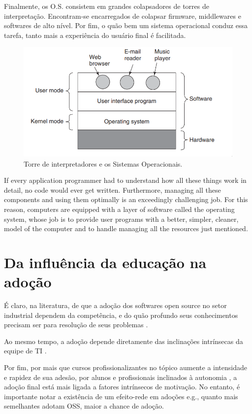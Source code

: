 \documentclass[
12pt,				%
openright,			%
oneside,			%
a4paper,			%
english,			%
french,				%
spanish,			%
brazil,				%
]{abntex2}
\begin{document}
Finalmente, os O.S. consistem em grandes colapsadores de torres de
interpretação. Encontram-se encarregados de colapsar firmware,
middlewares e softwares de alto nível. Por fim, o quão bem um sistema
operacional conduz essa tarefa, tanto mais a experiência do usuário
final é facilitada.

\begin{figure}[ht]
  \centering
  \caption{\label{fig:os} Torre de interpretadores e os Sistemas Operacionais.}
  \includegraphics[width=0.5\linewidth]{tower-os.png}
\end{figure}

\begin{citacao}
If every application programmer had to understand how all these things work in detail, no code would ever
get written. Furthermore, managing all these components and using them optimally
is an exceedingly challenging job. For this reason, computers are equipped with a
layer of software called the operating system, whose job is to provide
user programs with a better, simpler, cleaner, model of the computer
and to handle managing all the resources just mentioned. \cite{tanenbaum2015modern}
\end{citacao}


\section{Da influência da educação na adoção}

É claro, na literatura, de que a adoção dos softwares open source no
setor industrial
dependem da competência, e do quão profundo seus conhecimentos
precisam ser para resolução de seus problemas
\cite{li2013all,gallego2015open,spinellis2012organizational}. 

Ao mesmo tempo, a adoção depende diretamente das inclinações
intrínsecas da equipe de TI \cite{racero2021can}.

Por fim, por mais que cursos profissionalizantes no tópico aumente a
intensidade e rapidez de sua adesão, por alunos
\cite{racero2020predicting} e profissionais inclinados à autonomia
\cite{gallego2015open}, a adoção final está mais ligada a fatores
intrínsecos de motivação. No entanto, é importante notar a existência de um
efeito-rede em adoções \cite{spinellis2012organizational} e.g., quanto mais semelhantes adotam
OSS, maior a chance de adoção.
\end{document}

